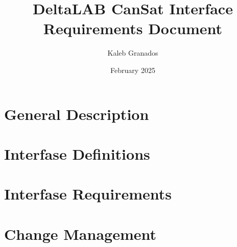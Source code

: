 \documentclass{article}
\title{DeltaLAB CanSat Interface Requirements Document}
\author{Kaleb Granados}
\date{February 2025}
\begin{document}
\maketitle
\newpage

\section{General Description}

\section{Interfase Definitions}

\section{Interfase Requirements}

\section{Change Management}
\end{document}
